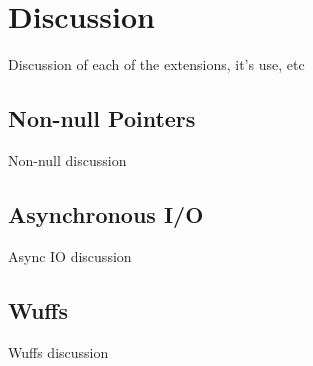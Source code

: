 \documentclass[main.tex]{subfiles}
\begin{document}
\section*{Discussion}
Discussion of each of the extensions, it's use, etc
\subsection*{Non-null Pointers}
Non-null discussion
\subsection*{Asynchronous I/O}
Async IO discussion
\subsection*{Wuffs}
Wuffs discussion
\end{document}
